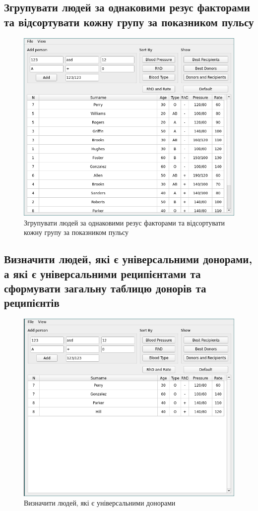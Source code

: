 \documentclass[oneside,14pt]{extarticle}
\begin{document}
\subsection{Згрупувати людей за однаковими резус факторами та відсортувати кожну групу за показником пульсу}
\begin{figure}[H]
	\centering
	\includegraphics[scale=0.7]{7}
	\caption{Згрупувати людей за однаковими резус факторами та відсортувати кожну групу за показником пульсу}
\end{figure}

\subsection{Визначити людей, які є універсальними донорами, а які є універсальними реципієнтами та сформувати загальну таблицю донорів та реципієнтів}
\begin{figure}[H]
	\centering
	\includegraphics[scale=0.7]{8}
	\caption{Визначити людей, які є універсальними донорами}
\end{figure}
\end{document}

